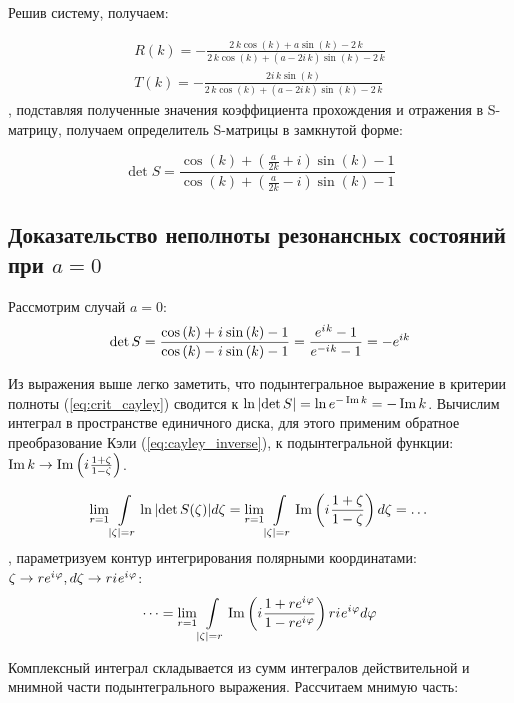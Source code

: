 Решив систему, получаем:

\begin{align*}
R(k) = -\frac{2 \, k \cos\left(k\right) + a \sin\left(k\right) - 2 \, k}{2 \, k \cos\left(k\right) + {\left(a - 2 i \, k\right)} \sin\left(k\right) - 2 \, k} \\
T(k) = -\frac{2 i \, k \sin\left(k\right)}{2 \, k \cos\left(k\right) + {\left(a - 2 i \, k\right)} \sin\left(k\right) - 2 \, k}
\end{align*}
, подставляя полученные значения коэффициента прохождения и отражения в S-матрицу, получаем определитель S-матрицы в замкнутой форме:

\begin{equation}\label{eq:ring_detS}
\det S = 
\frac
{\cos\left(k\right) + {\left(\frac{a}{2 k} + i\right)} \sin\left(k\right) - 1}
{\cos\left(k\right) + {\left(\frac{a}{2 k} - i\right)} \sin\left(k\right) - 1}
\end{equation}


\subsection{Доказательство неполноты резонансных состояний при $a=0$}\label{sec:ring_incompl_proof}
Рассмотрим случай $a=0$:
\[
\det S
= \frac
{\cos\left(k\right) + {i\mkern1mu} \sin\left(k\right) - 1}
{\cos\left(k\right) - {i\mkern1mu} \sin\left(k\right) - 1}
= \frac{e^{{i\mkern1mu} k} - 1}{e^{-{i\mkern1mu} k} - 1}
= -e^{i k}
\]

Из выражения выше легко заметить, что подынтегральное выражение в критерии полноты (\ref{eq:crit_cayley}) сводится к $\ln \abs{\det S} = \ln e^{- \operatorname{Im} k} = -\operatorname{Im} k$. Вычислим интеграл в пространстве единичного диска, для этого применим обратное преобразование Кэли (\ref{eq:cayley_inverse}), к подынтегральной функции: $\operatorname{Im} k \to \operatorname{Im} \left( {i\mkern1mu} \frac{1 + \zeta}{1 - \zeta} \right) $.

\[
  \lim\limits_{r = 1} \int\limits_{\abs{\zeta} = r} \ln \abs{\det S(\zeta)} d \zeta
= \lim\limits_{r = 1} \int\limits_{\abs{\zeta} = r} \operatorname{Im} \left( {i\mkern1mu} \frac{1 + \zeta}{1 - \zeta} \right)  d\zeta = \dots
\]
, параметризуем контур интегрирования полярными координатами: $\zeta \to r e^{{i\mkern1mu} \varphi}, d\zeta \to r {i\mkern1mu} e^{{i\mkern1mu} \varphi}$:
\[
\dots = \lim\limits_{r = 1} \int\limits_{\abs{\zeta} = r} \operatorname{Im} \left( {i\mkern1mu} \frac{1 + r e^{{i\mkern1mu} \varphi}}{1 - r e^{{i\mkern1mu} \varphi}} \right) r {i\mkern1mu} e^{{i\mkern1mu} \varphi} d\varphi
\]

Комплексный интеграл складывается из сумм интегралов действительной и мнимной части подынтегрального выражения. Рассчитаем мнимую часть:

